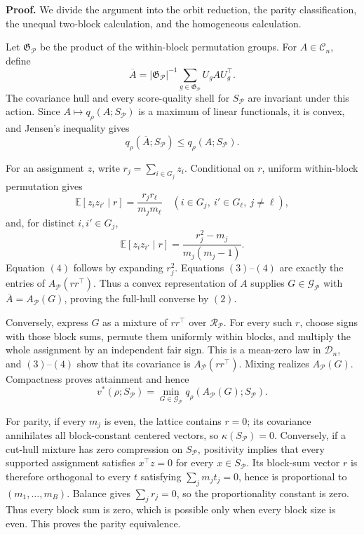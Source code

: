 \textbf{Proof.}
We divide the argument into the orbit reduction, the parity classification, the unequal two-block calculation, and the homogeneous calculation.

Let \(\mathfrak G_{\mathcal P}\) be the product of the within-block permutation groups.  For \(A\in\mathcal C_n\), define
\[
\overline A=|\mathfrak G_{\mathcal P}|^{-1}
\sum_{g\in\mathfrak G_{\mathcal P}}U_gAU_g^\top.
\tag{1}
\]
The covariance hull and every score-quality shell for \(S_{\mathcal P}\) are invariant under this action.  Since \(A\mapsto q_\rho(A;S_{\mathcal P})\) is a maximum of linear functionals, it is convex, and Jensen's inequality gives
\[
q_\rho(\overline A;S_{\mathcal P})\leq q_\rho(A;S_{\mathcal P}).
\tag{2}
\]

For an assignment \(z\), write \(r_j=\sum_{i\in G_j}z_i\).  Conditional on \(r\), uniform within-block permutation gives
\[
\mathbb E[z_i z_{i'}\mid r]=\frac{r_jr_\ell}{m_jm_\ell}
\quad
(i\in G_j,\ i'\in G_\ell,\ j\ne\ell),
\tag{3}
\]
and, for distinct \(i,i'\in G_j\),
\[
\mathbb E[z_i z_{i'}\mid r]
=\frac{r_j^2-m_j}{m_j(m_j-1)}.
\tag{4}
\]
Equation \((4)\) follows by expanding \(r_j^2\).  Equations \((3)\)--\((4)\) are exactly the entries of \(A_{\mathcal P}(rr^\top)\).  Thus a convex representation of \(A\) supplies \(G\in\mathcal G_{\mathcal P}\) with \(\overline A=A_{\mathcal P}(G)\), proving the full-hull converse by \((2)\).

Conversely, express \(G\) as a mixture of \(rr^\top\) over \(\mathcal R_{\mathcal P}\).  For every such \(r\), choose signs with those block sums, permute them uniformly within blocks, and multiply the whole assignment by an independent fair sign.  This is a mean-zero law in \(\mathcal D_n\), and \((3)\)--\((4)\) show that its covariance is \(A_{\mathcal P}(rr^\top)\).  Mixing realizes \(A_{\mathcal P}(G)\).  Compactness proves attainment and hence
\[
v^*(\rho;S_{\mathcal P})
=\min_{G\in\mathcal G_{\mathcal P}}
q_\rho(A_{\mathcal P}(G);S_{\mathcal P}).
\tag{5}
\]

For parity, if every \(m_j\) is even, the lattice contains \(r=0\); its covariance annihilates all block-constant centered vectors, so \(\kappa(S_{\mathcal P})=0\).  Conversely, if a cut-hull mixture has zero compression on \(S_{\mathcal P}\), positivity implies that every supported assignment satisfies \(x^\top z=0\) for every \(x\in S_{\mathcal P}\).  Its block-sum vector \(r\) is therefore orthogonal to every \(t\) satisfying \(\sum_jm_jt_j=0\), hence is proportional to \((m_1,\ldots,m_B)\).  Balance gives \(\sum_jr_j=0\), so the proportionality constant is zero.  Thus every block sum is zero, which is possible only when every block size is even.  This proves the parity equivalence.

